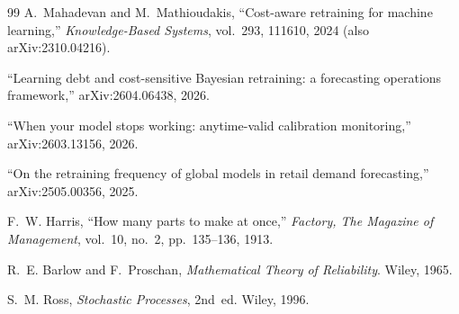 \documentclass[conference]{IEEEtran}
\begin{document}
\begin{thebibliography}{99}
 A.~Mahadevan and M.~Mathioudakis, ``Cost-aware
retraining for machine learning,'' \emph{Knowledge-Based Systems}, vol.~293,
111610, 2024 (also arXiv:2310.04216).

 ``Learning debt and cost-sensitive Bayesian
retraining: a forecasting operations framework,'' arXiv:2604.06438, 2026.

 ``When your model stops working: anytime-valid
calibration monitoring,'' arXiv:2603.13156, 2026.

 ``On the retraining frequency of global models in
retail demand forecasting,'' arXiv:2505.00356, 2025.

 F.~W. Harris, ``How many parts to make at once,''
\emph{Factory, The Magazine of Management}, vol.~10, no.~2, pp.~135--136,
1913.

 R.~E. Barlow and F.~Proschan, \emph{Mathematical Theory
of Reliability}. Wiley, 1965.

 S.~M. Ross, \emph{Stochastic Processes}, 2nd~ed. Wiley,
1996.

\end{thebibliography}
\end{document}
